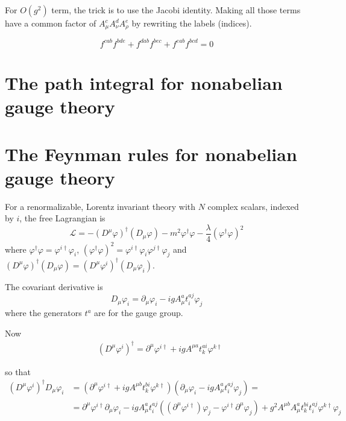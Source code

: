 \documentclass[twoside]{amsart}
\newcommand{\solutionhead}[1]
  {\smallskip
   \noindent{\large\bf Solution #1.}
   }
\begin{document}
For $O(g^2)$ term, the trick is to use the Jacobi identity.  Making all those terms have a common factor of $A_{\mu}^c A_{\nu}^d A_{\rho}^e$ by rewriting the labels (indices).  

\[
f^{cab} f^{bde} + f^{dab} f^{bec} + f^{eab} f^{bcd} = 0 
\]



\section{The path integral for nonabelian gauge theory }




\section{The Feynman rules for nonabelian gauge theory}

\solutionhead{72.1}

For a renormalizable, Lorentz invariant theory with $N$ complex scalars, indexed by $i$, the free Lagrangian is 
\[
\mathcal{L} = - (D^{\mu} \varphi)^{\dag} ( D_{\mu} \varphi) -  m^2 \varphi^{\dag} \varphi - \frac{\lambda}{4} (\varphi^{\dag} \varphi)^2 
\]
where $\varphi^{\dag} \varphi = \varphi^{i \dag} \varphi_i$, $(\varphi^{\dag} \varphi)^2 = \varphi^{i \dag} \varphi_i \varphi^{j \dag} \varphi_j$ and $(D^{\mu} \varphi)^{\dag} (D_{\mu} \varphi) = (D^{\mu} \varphi^i)^{\dag}  (D_{\mu} \varphi_i )$.  

The covariant derivative is 
\[
D_{\mu} \varphi_i = \partial_{\mu} \varphi_i - ig A_{\mu}^a t^{aj}_i \varphi_j
\]
where the generators $t^{a}$ are for the gauge group.  

Now
\[
\begin{aligned}
  & (D^{\mu} \varphi^i)^{\dag} = \partial^{\mu} \varphi^{i \dag} + ig A^{\mu a} t_k^{ai} \varphi^{k \dag} 
\end{aligned} 
\]

so that 
\[
\begin{aligned} 
   (D^{\mu} \varphi^i)^{\dag} D_{\mu} \varphi_i & = ( \partial^{\mu} \varphi^{i \dag} + ig A^{\mu b} t_k^{bi} \varphi^{k\dag} ) ( \partial_{\mu} \varphi_i - ig A_{\mu}^a t^{aj}_i \varphi_j )  = \\
  & = \partial^{\mu} \varphi^{i \dag} \partial_{\mu} \varphi_i - ig A_{\mu}^a t_i^{aj} ( (\partial^{\mu} \varphi^{i \dag} ) \varphi_j - \varphi^{i \dag} \partial^{\mu} \varphi_j ) + g^2 A^{\mu b} A_{\mu}^a t_k^{bi} t_i^{aj} \varphi^{k \dag} \varphi_j
\end{aligned}
\]
\end{document}

